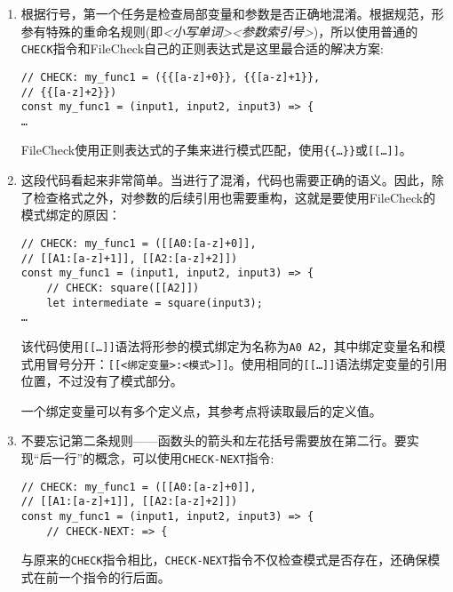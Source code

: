 \begin{enumerate}
\item 根据行号，第一个任务是检查局部变量和参数是否正确地混淆。根据规范，形参有特殊的重命名规则(即\textit{<小写单词><参数索引号>})，所以使用普通的\texttt{CHECK}指令和FileCheck自己的正则表达式是这里最合适的解决方案:

\begin{lstlisting}[style=styleJavaScript]
// CHECK: my_func1 = ({{[a-z]+0}}, {{[a-z]+1}},
// {{[a-z]+2}})
const my_func1 = (input1, input2, input3) => {
…
\end{lstlisting}

FileCheck使用正则表达式的子集来进行模式匹配，使用\texttt{\{\{…\}\}}或\texttt{[[…]]}。

\item 这段代码看起来非常简单。当进行了混淆，代码也需要正确的语义。因此，除了检查格式之外，对参数的后续引用也需要重构，这就是要使用FileCheck的模式绑定的原因：

\begin{lstlisting}[style=styleJavaScript]
// CHECK: my_func1 = ([[A0:[a-z]+0]],
// [[A1:[a-z]+1]], [[A2:[a-z]+2]])
const my_func1 = (input1, input2, input3) => {
	// CHECK: square([[A2]])
	let intermediate = square(input3);
…
\end{lstlisting}

该代码使用\texttt{[[…]]}语法将形参的模式绑定为名称为\texttt{A0~A2}，其中绑定变量名和模式用冒号分开：\texttt{[[<绑定变量>:<模式>]]}。使用相同的\texttt{[[…]]}语法绑定变量的引用位置，不过没有了模式部分。

\begin{tcolorbox}[colback=blue!5!white,colframe=blue!75!black, fonttitle=\bfseries,title=Note]
\hspace*{0.7cm}一个绑定变量可以有多个定义点，其参考点将读取最后的定义值。
\end{tcolorbox}

\item 不要忘记第二条规则——函数头的箭头和左花括号需要放在第二行。要实现“后一行”的概念，可以使用\texttt{CHECK-NEXT}指令:

\begin{lstlisting}[style=styleJavaScript]
// CHECK: my_func1 = ([[A0:[a-z]+0]],
// [[A1:[a-z]+1]], [[A2:[a-z]+2]])
const my_func1 = (input1, input2, input3) => {
	// CHECK-NEXT: => {
\end{lstlisting}

与原来的\texttt{CHECK}指令相比，\texttt{CHECK-NEXT}指令不仅检查模式是否存在，还确保模式在前一个指令的行后面。


\end{enumerate}
